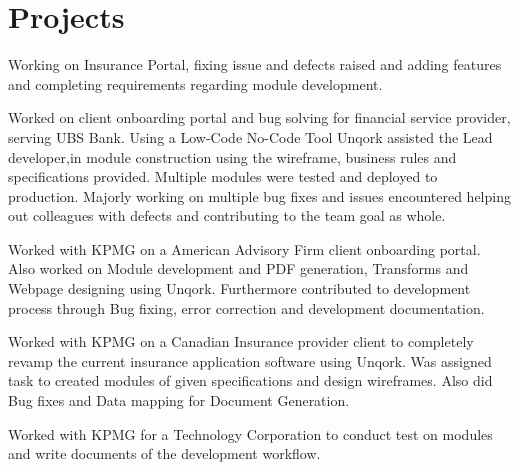 \documentclass[]{deedy-resume-openfont}
\begin{document}
\begin{minipage}[t]{0.66\textwidth}

\section{Projects}
Working on Insurance Portal, fixing issue and defects raised and adding features and completing requirements regarding module development.
\sectionsep

Worked on client onboarding portal and bug solving for financial service provider, serving UBS Bank. Using a Low-Code No-Code Tool Unqork assisted the Lead developer,in module construction using the wireframe, business rules and specifications provided. Multiple modules were tested and deployed to production. Majorly working on multiple bug fixes and issues encountered helping out colleagues with defects and contributing to the team goal as whole.
\sectionsep

Worked with KPMG on a American Advisory Firm client onboarding portal.  Also worked on Module development and PDF generation, Transforms and Webpage designing using Unqork. Furthermore contributed to development process through Bug fixing, error correction and development documentation.
\sectionsep

Worked with KPMG on a Canadian Insurance provider client to completely revamp the current insurance application software using Unqork. Was assigned task to created modules of given specifications and design wireframes. Also did Bug fixes and Data mapping for Document Generation.
\sectionsep

Worked with KPMG for a Technology Corporation to conduct test on modules and write documents of the development workflow.
\sectionsep
\end{minipage}



 
\end{document}
